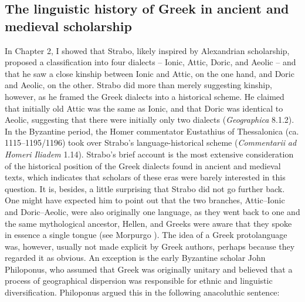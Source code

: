\subsection{The linguistic history of Greek in ancient and medieval scholarship}
\hypertarget{Toc19704835}{}
In Chapter 2, I showed that Strabo, likely inspired by Alexandrian scholarship, proposed a classification into four dialects – Ionic, Attic, Doric, and Aeolic – and that he saw a close kinship between Ionic and Attic, on the one hand, and Doric and Aeolic, on the other. Strabo did more than merely suggesting kinship, however, as he framed the Greek dialects into a historical scheme. He claimed that initially old Attic was the same as Ionic, and that Doric was identical to Aeolic, suggesting that there were initially only two dialects (\textit{Geographica} 8.1.2). In the Byzantine period, the Homer commentator Eustathius of Thessalonica (ca. 1115–1195/1196) took over Strabo’s language-historical scheme (\textit{Commentarii} \textit{ad} \textit{Homeri} \textit{Iliadem} 1.14). Strabo’s brief account is the most extensive consideration of the historical position of the Greek dialects found in ancient and medieval texts, which indicates that scholars of these eras were barely interested in this question. It is, besides, a little surprising that Strabo did not go further back. One might have expected him to point out that the two branches, Attic–Ionic and Doric–Aeolic, were also originally one language, as they went back to one and the same mythological ancestor, Hellen, and Greeks were aware that they spoke in essence a single tongue (see Morpurgo \citealt{Davies1987}). The idea of a Greek protolanguage was, however, usually not made explicit by Greek authors, perhaps because they regarded it as obvious. An exception is the early Byzantine scholar John Philoponus, who assumed that Greek was originally unitary and believed that a process of geographical dispersion was responsible for ethnic and linguistic diversification. Philoponus argued this in the following anacoluthic sentence:

